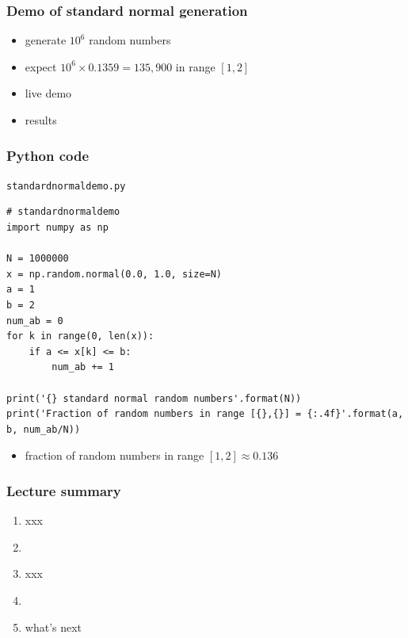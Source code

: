 \documentclass[english,14pt]{beamer}
\begin{document}

\begin{frame}[fragile]

\frametitle{Demo of standard normal generation}

\begin{itemize}
	\item generate $10^6$ random numbers
	\item expect $10^6 \times 0.1359 = 135,900$ in range $[1,2]$
	\item live demo
	\item results
\end{itemize}

\end{frame}


\begin{frame}[fragile]

\frametitle{Python code}

\texttt{standardnormaldemo.py}
\begin{lstlisting}[style=CStyle,basicstyle=\scriptsize]
# standardnormaldemo
import numpy as np

N = 1000000
x = np.random.normal(0.0, 1.0, size=N)
a = 1
b = 2
num_ab = 0
for k in range(0, len(x)):
    if a <= x[k] <= b:
        num_ab += 1

print('{} standard normal random numbers'.format(N))
print('Fraction of random numbers in range [{},{}] = {:.4f}'.format(a, b, num_ab/N))
\end{lstlisting}

\begin{itemize}
	\item fraction of random numbers in range $[1,2] \approx 0.136$
\end{itemize}

\end{frame}


\begin{frame}[fragile]

\frametitle{Lecture summary}

\begin{enumerate}
	\item xxx
	
	\item[]
	
	\item xxx
	
	\item[]
	
	\item what's next
	
\end{enumerate}

\end{frame}
\end{document}
